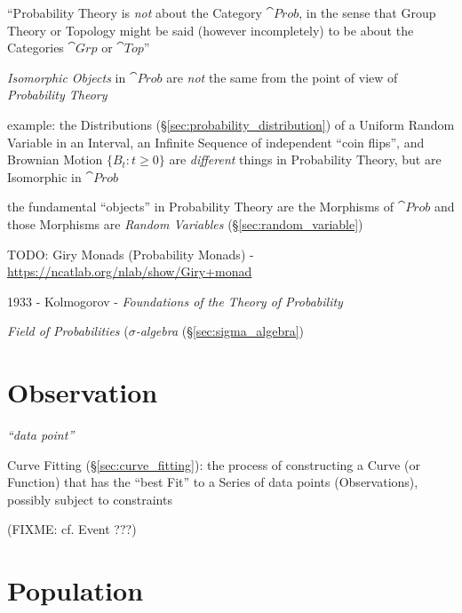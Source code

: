 ``Probability Theory is \emph{not} about the Category $\cat{Prob}$, in the sense
that Group Theory or Topology might be said (however incompletely) to be about
the Categories $\cat{Grp}$ or $\cat{Top}$''

\emph{Isomorphic Objects} in $\cat{Prob}$ are \emph{not} the same from the point
of view of \emph{Probability Theory}

example: the Distributions (\S\ref{sec:probability_distribution}) of a Uniform
Random Variable in an Interval, an Infinite Sequence of independent ``coin
flips'', and Brownian Motion $\{B_t : t \geq 0\}$ are \emph{different} things in
Probability Theory, but are Isomorphic in $\cat{Prob}$

the fundamental ``objects'' in Probability Theory are the Morphisms of
$\cat{Prob}$ and those Morphisms are \emph{Random Variables}
(\S\ref{sec:random_variable})

TODO: Giry Monads (Probability Monads) -
\url{https://ncatlab.org/nlab/show/Giry+monad}


\asterism

1933 - Kolmogorov - \emph{Foundations of the Theory of Probability}

\emph{Field of Probabilities} (\emph{$\sigma$-algebra}
(\S\ref{sec:sigma_algebra})



\section{Observation}\label{sec:observation}

\emph{``data point''}

\fist Curve Fitting (\S\ref{sec:curve_fitting}): the process of constructing a
Curve (or Function) that has the ``best Fit'' to a Series of data points
(Observations), possibly subject to constraints

(FIXME: cf. Event ???)



\section{Population}\label{sec:population}

